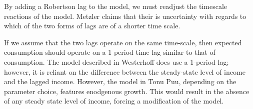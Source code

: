 \documentclass[]{article}
\begin{document}
	By adding a Robertson lag to the model, we must readjust the timescale reactions of the model. Metzler claims that their is uncertainty with regards to which of the two forms of lags are of a shorter time scale. 

	If we assume that the two lags operate on the same time-scale, then expected consumption should operate on a 1-period time lag similar to that of consumption. The model described in Westerhoff does use a 1-period lag; however, it is reliant on the difference between the steady-state level of income and the lagged income. However, the model in Tonu Puu, depending on the parameter choice, features enodgenous growth. This would result in the absence of any steady state level of income, forcing a modification of the model. 

	
\end{document}
